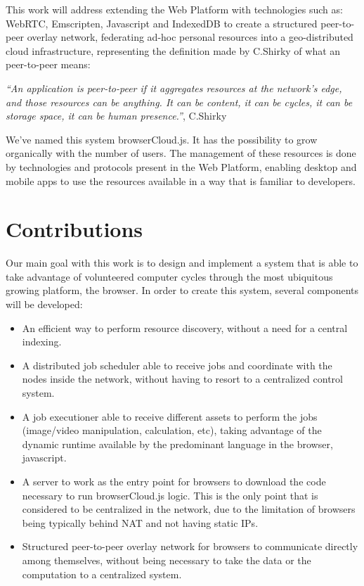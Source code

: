 This work will address extending the Web Platform with technologies such as: WebRTC, Emscripten, Javascript and IndexedDB to create a structured peer-to-peer overlay network, federating ad-hoc personal resources into a geo-distributed cloud infrastructure, representing the definition made by C.Shirky of what an peer-to-peer means:

  \textit{``An application is peer-to-peer if it aggregates resources at the network’s edge, and those resources can be anything. It can be content, it can be cycles, it can be storage space, it can be human presence.''}, C.Shirky \cite{Shirky}

We've named this system browserCloud.js. It has the possibility to grow organically with the number of users. The management of these resources is done by technologies and protocols present in the Web Platform, enabling desktop and mobile apps to use the resources available in a way that is familiar to developers. 

\section{Contributions}

Our main goal with this work is to design and implement a system that is able to take advantage of volunteered computer cycles through the most ubiquitous growing platform, the browser. In order to create this system, several components will be developed:

\begin{itemize}
    \item An efficient way to perform resource discovery, without a need for a central indexing.
    \item A distributed job scheduler able to receive jobs and coordinate with the nodes inside the network, without having to resort to a centralized control system.
    \item A job executioner able to receive different assets to perform the jobs (image/video manipulation, calculation, etc), taking advantage of the dynamic runtime available by the predominant language in the browser, javascript.
    \item A server to work as the entry point for browsers to download the code necessary to run browserCloud.js logic. This is the only point that is considered to be centralized in the network, due to the limitation of browsers being typically behind NAT and not having static IPs.
    \item Structured peer-to-peer overlay network for browsers to communicate directly among themselves, without being necessary to take the data or the computation to a centralized system.
\end{itemize}

